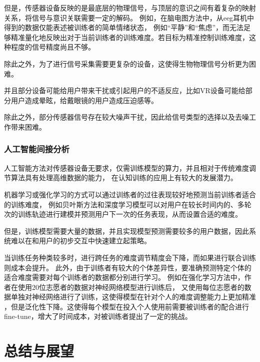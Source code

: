 \documentclass{article}
\begin{document}
            但是，传感器设备反映的是最底层的物理信号，与顶层的意识之间有着复杂的映射关系，将信号与意识关联需要一定的解码。
            例如，在脑电图方法中，从eeg耳机中得到的数据仅能表述被训练者的简单情绪状态，
            例如“平静”和“焦虑”，而无法足够精准量化地反映出对于当前训练者的训练难度。若目标为精准控制训练难度，这种程度的信号精度尚且不够。

            除此之外，为了进行信号采集需要更复杂的设备，这使得生物物理信号分析更为困难。

            并且部分设备可能给用户带来干扰或引起用户的不适反应，比如VR设备可能给部分用户造成晕眩，给戴眼镜的用户造成压迫感等。

            除此之外，部分传感器信号存在较大噪声干扰，因此给信号类型的选择以及去噪工作带来困难。
            
            \subsubsection{人工智能间接分析}
            人工智能方法对传感器设备无要求，仅需训练模型的算力，并且相对于传统难度调节算法具有处理高维数据的能力，
            在认知训练的应用上有较大的发展潜力。

            机器学习或强化学习的方式可以通过训练者的过往表现较好地预测当前训练者适合的训练难度，
            例如贝叶斯方法和深度学习模型可以对用户在较长时间内的、多轮次的训练轨迹进行建模并预测用户下一次的任务表现，从而设置合适的难度。

            但是，训练模型需要大量的数据，并且实现模型预测需要较多的用户数据，因此系统难以在和用户的初步交互中快速建立起策略。
            
            当训练任务种类较多时，进行跨任务的难度调节精度会下降，而如果进行联合训练则成本会提升。
            此外，由于训练者有较大的个体差异性，要准确预测特定个体的适合难度需要对每个训练者的数据都分别进行学习。
            例如在强化学习方法中，作者在使用20位志愿者的数据对神经网络模型进行训练后，
            又使用每位志愿者的数据单独对神经网络进行了训练，这使得模型在针对个人的难度调整能力上更加精准
            ，但是泛化性下降。这使得每个模型在投入个人使用前需要被训练者的配合进行fine-tune，增大了时间成本，对被训练者提出了一定的挑战。
            






    \section{总结与展望}
\end{document}
